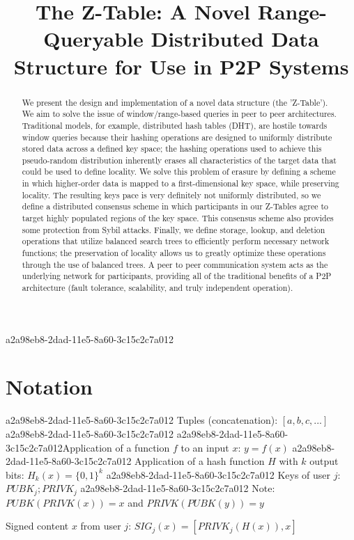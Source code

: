 \documentclass[12pt]{article}
\title{The Z-Table: A Novel Range-Queryable Distributed Data Structure for Use in P2P Systems}
\begin{document}
\maketitle

\begin{abstract}
We present the design and implementation of a novel data structure (the 'Z-Table'). We aim to solve the issue of window/range-based queries in peer to peer architectures. Traditional models, for example,  distributed hash tables (DHT), are hostile towards window queries because their hashing operations are designed to uniformly distribute stored data across a defined key space; the hashing operations used to achieve this pseudo-random distribution inherently erases all characteristics of the target data that could be used to define locality. We solve this problem of erasure by defining a scheme in which higher-order data is mapped to a first-dimensional key space, while preserving locality. The resulting keys pace is very definitely not uniformly distributed, so we define a distributed consensus scheme in which participants in our Z-Tables agree to target highly populated regions of the key space. This consensus scheme also provides some protection from Sybil attacks. Finally, we define storage, lookup, and deletion operations that utilize balanced search trees to efficiently perform necessary network functions; the preservation of locality allows us to greatly optimize these operations through the use of balanced trees. A peer to peer communication system acts as the underlying network for participants, providing all of the traditional benefits of a P2P architecture (fault tolerance, scalability, and truly independent operation).
\end{abstract}
a2a98eb8-2dad-11e5-8a60-3c15c2c7a012
\section{Notation}
a2a98eb8-2dad-11e5-8a60-3c15c2c7a012
Tuples (concatenation): $[a,b,c,...]$
a2a98eb8-2dad-11e5-8a60-3c15c2c7a012
a2a98eb8-2dad-11e5-8a60-3c15c2c7a012Application of a function $f$ to an input $x$: $y=f(x)$
a2a98eb8-2dad-11e5-8a60-3c15c2c7a012
Application of a hash function $H$ with $k$ output bits: $H_{k}(x) = \{0,1\}^k$
a2a98eb8-2dad-11e5-8a60-3c15c2c7a012
Keys of user $j$: $ PUBK_j; PRIVK_j $
a2a98eb8-2dad-11e5-8a60-3c15c2c7a012
Note: $PUBK(PRIVK(x)) = x$ and $PRIVK(PUBK(y)) = y$~

Signed content $x$ from user $j$: $SIG_j(x) = \left[ PRIVK_j( H(x) ), x \right]$
\end{document}

